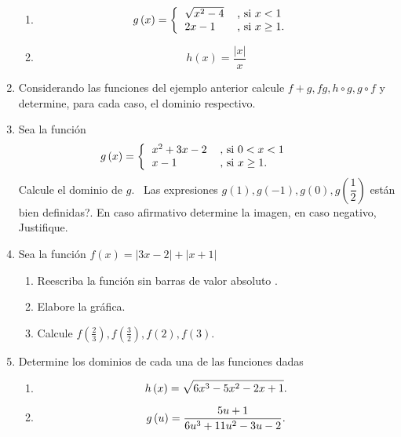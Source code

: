 \begin{enumerate}
\begin{enumerate}
\item
\[
g\left(  x\right)  =\left\{
\begin{tabular}
[c]{ll}%
$\sqrt{x^{2}-4}$ & , si $x<1$\\
$2x-1$ & , si $x\geq1.$%
\end{tabular}
\ \ \right.
\]


\item
\[
h\left(  x\right)  =\dfrac{\left\vert x\right\vert }{x}%
\]

\end{enumerate}

\item Considerando las funciones del ejemplo anterior calcule $f+g,fg,h\circ
g,g\circ f$ y determine, para cada caso, el dominio respectivo.

\item Sea la funci\'{o}n%
\[
g\left(  x\right)  =\left\{
\begin{tabular}
[c]{ll}%
$x^{2}+3x-2$ & , si $0<x<1$\\
$x-1$ & , si $x\geq1.$%
\end{tabular}
\ \ \ \ \ \ \right.
\]
Calcule el dominio de $g$. \textquestiondown \ Las expresiones $g\left(
1\right)  ,g\left(  -1\right)  ,g\left(  0\right)  ,g\left(  \dfrac{1}%
{2}\right)  $ est\'{a}n bien definidas?. En caso afirmativo determine la
imagen, en caso negativo, Justifique.

\item Sea la funci\'{o}n $f\left(  x\right)  =\left\vert 3x-2\right\vert
+\left\vert x+1\right\vert $

\begin{enumerate}
\item Reescriba la funci\'{o}n sin barras de valor absoluto .

\item Elabore la gr\'{a}fica.

\item Calcule $f(\frac{2}{3}),f(\frac{3}{2}),f\left(  2\right)  ,f\left(
3\right)  .$
\end{enumerate}

\item Determine los dominios de cada una de las funciones dadas

\begin{enumerate}
\item
\[
h\left(  x\right)  =\sqrt{\allowbreak6x^{3}-5x^{2}-2x+1}.
\]


\item
\[
g\left(  u\right)  =\dfrac{5u+1}{\allowbreak6u^{3}+11u^{2}-3u-2}.
\]



\end{enumerate}
\end{enumerate}
